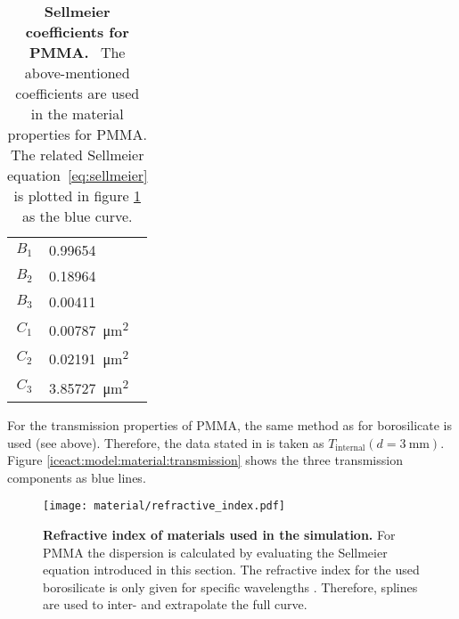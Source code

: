 \begin{table}[H]
	\centering
	\begin{tabular}{c|l}
		$B_1$  & \num{0.99654}  \\
		$B_2$  & \num{0.18964}  \\
		$B_3$  & \num{0.00411}  \\
		$C_1$  & \SI{0.00787}{\micro\meter\squared}  \\
		$C_2$  & \SI{0.02191}{\micro\meter\squared}  \\
		$C_3$  & \SI{3.85727}{\micro\meter\squared}  \\
	\end{tabular}
	\caption[Sellmeier coefficients for PMMA]{\textbf{Sellmeier coefficients for PMMA.}~\cite{iceact:refractiveindex} The above-mentioned coefficients are used in the \geant material properties for PMMA. The related Sellmeier equation~\eqref{eq:sellmeier} is plotted in figure \ref{iceact:model:material:refractive_index} as the blue curve.}
	\label{iceact:model:pmma_sellmeiercoeffs}
\end{table}

For the transmission properties of PMMA, the same method as for borosilicate is used (see above). Therefore, the data stated in \cite{famous:niggemann} is taken as $T_\text{internal}(d = \SI{3}{\milli\meter})$. Figure \ref{iceact:model:material:transmission} shows the three transmission components as blue lines.

\begin{figure}[H]
	\centering
	\texttt{[image: material/refractive\_index.pdf]}
	\caption[Refractive index of used materials]{\textbf{Refractive index of materials used in the simulation.} For PMMA the dispersion is calculated by evaluating the Sellmeier equation introduced in this section. The refractive index for the used borosilicate is only given for specific wavelengths \cite{iceact:borosilicate:datasheet}. Therefore, splines are used to inter- and extrapolate the full curve.}
	\label{iceact:model:material:refractive_index}	
\end{figure}

